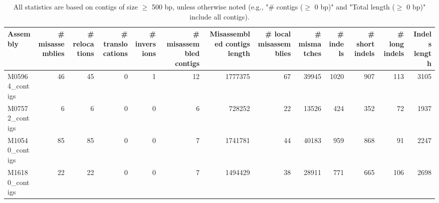 \documentclass[12pt,a4paper]{article}
\begin{document}
\begin{table}[ht]
\begin{center}
\caption{All statistics are based on contigs of size $\geq$ 500 bp, unless otherwise noted (e.g., "\# contigs ($\geq$ 0 bp)" and "Total length ($\geq$ 0 bp)" include all contigs).}
\begin{tabular}{|l*{12}{|r}|}
\hline
Assembly & \# misassemblies &     \# relocations &     \# translocations &     \# inversions & \# misassembled contigs & Misassembled contigs length & \# local misassemblies & \# mismatches & \# indels &     \# short indels &     \# long indels & Indels length \\ \hline
M05964\_contigs & 46 & 45 & 0 & 1 & 12 & 1777375 & 67 & 39945 & 1020 & 907 & 113 & 3105 \\ \hline
M07572\_contigs & 6 & 6 & 0 & 0 & 6 & 728252 & 22 & 13526 & 424 & 352 & 72 & 1937 \\ \hline
M10540\_contigs & 85 & 85 & 0 & 0 & 7 & 1741781 & 44 & 40183 & 959 & 868 & 91 & 2247 \\ \hline
M16180\_contigs & 22 & 22 & 0 & 0 & 7 & 1494429 & 38 & 28911 & 771 & 665 & 106 & 2698 \\ \hline
\end{tabular}
\end{center}
\end{table}
\end{document}
